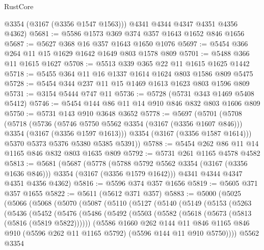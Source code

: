 \begin{lexlean}{RustCore}
\begin{coremodule}
        @3354
        (@3167 (@3356 @1547 @1563)))
      @4341
      @4344
      @4347
      @4351
      @4356
      @4362)
@5681 := @5586 @1573 @369 @374 @357 @1643 @1652 @846 @1656
@5687 := @5627 @368 @16 @357 @1643 @1650 @1076
@5697 := @5454 @366 @264 @11 @15 @1629 @1642 @1649 @803 @1578 @809
@5701 := @5488 @366 @11 @1615 @1627
@5708 := @5513 @339 @365 @22 @11 @1615 @1625 @1442
@5718 := @5455 @364 @11 @16 @1337 @1614 @1624 @803 @1586 @809 @5475
@5728 := @5454 @344 @237 @11 @15 @1469 @1613 @1623 @803 @1596 @809
@5731 := @3154 @5444 @747 @11
@5736 := @5728 (@5731 @343 @1469 @5408 @5412)
@5746 := @5454 @144 @86 @11 @14 @910 @846 @832 @803 @1606 @809
@5750 := @5731 @143 @910 @3648 @3652
@5778 := @5697
    (@5701
      (@5708
        (@5718
          (@5736
            (@5746 @5750 @5562 @3354 (@3167 (@3356 @1607 @846)))
            @3354
            (@3167 (@3356 @1597 @1613)))
          @3354
          (@3167 (@3356 @1587 @1614)))
        @5370
        @5373
        @5376
        @5380
        @5385
        @5391))
@5788 := @5454 @262 @86 @11 @14 @1165 @846 @832 @803 @1635 @809
@5792 := @5731 @261 @1165 @4578 @4582
@5813 := @5681
    (@5687
      (@5778 (@5788 @5792 @5562 @3354 (@3167 (@3356 @1636 @846))) @3354 (@3167 (@3356 @1579 @1642)))
      @4341
      @4344
      @4347
      @4351
      @4356
      @4362)
@5816 := @5596 @374 @357 @1656
@5819 := @5605 @371 @357 @1655
@5822 := @5611 (@5612 @371 @357)
@5883 := @5000
    (@5025
      (@5066
        (@5068
          (@5070
            (@5087
              (@5110
                (@5127
                  (@5140
                    (@5149
                      (@5153
                        (@5263
                          (@5436
                            (@5452
                              (@5476
                                (@5486
                                  (@5492
                                    (@5503
                                      (@5582 (@5618 (@5673 (@5813 (@5816 (@5819 @5822))))))
                                      (@5586
                                        @1660
                                        @262
                                        @144
                                        @11
                                        @846
                                        @1165
                                        @846
                                        @910
                                        (@5596 @262 @11 @1165 @5792)
                                        (@5596 @144 @11 @910 @5750))))
                                  @5562
                                  @3354

\end{coremodule}
\end{lexlean}
